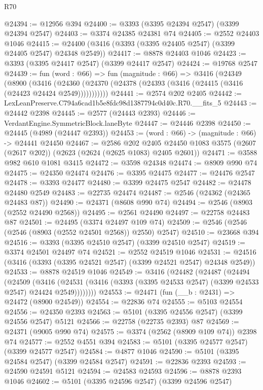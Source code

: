 \begin{lexlean}{R70}
\begin{coremodule}
@24394 := @12956 @394
@24400 := @3393 (@3395 @24394 @2547) (@3399 @24394 @2547)
@24403 := @3374 @24385 @24381 @74
@24405 := @2552 @24403 @1046
@24415 := @24400 (@3416 (@3393 (@3395 @24405 @2547) (@3399 @24405 @2547) @24348 @2549))
@24417 := @8878 @24403 @1046
@24423 := @3393 (@3395 @24417 @2547) (@3399 @24417 @2547)
@24424 := @19768 @2547
@24439 := fun (word : @66) =>
  fun (magnitude : @66) =>
  @3416
    (@24349
      (@8900
        (@3416 (@24360 (@24370 (@24378 (@24393 (@3416 (@24415 (@3416 (@24423 @24424 @2549)))))))))))
@24441 := @2574 @202 @2405
@24442 := LexLeanPreserve.C794a6cad1b5e8fdc98d1387794c0d40c.R70.__fits_5
@24443 := @24442 @2398
@24445 := @2577 (@24443 @2393)
@24446 := VerdantEngine.SymmetricBlock.laneByte
@24447 := @24446 @2398
@24450 := @24445 (@4989 (@24447 @2393))
@24453 := (word : @66) -> (magnitude : @66) -> @24441 @24450
@24467 := @2586
    @202
    @2405
    @24450
    @1083
    @3575
    (@2607 (@2617 @202))
    (@2623 (@2624 (@2625 @1083) @2405 @2601))
@24471 := @3588 @982 @610 @1081 @3415
@24472 := @3598 @24348
@24474 := @8909 @990 @74
@24475 := @24350 @24474
@24476 := @3395 @24475
@24477 := @24476 @2547
@24478 := @3393 @24477
@24480 := @3399 @24475 @2547
@24482 := @24478 @24480 @2549
@24483 := @22735 @24474
@24487 := @2546 (@24362 (@24365 @24483 @87))
@24490 := @24371 (@8608 @990 @74)
@24494 := @2546 (@8903 (@2552 @24490 @2568))
@24495 := @2561 @24490
@24497 := @22758 @24483 @87
@24501 := @24495 (@3374 @24497 @109 @74)
@24509 := @2546 (@2546 (@2546 (@8903 (@2552 @24501 @2568)) @2550) @2547)
@24510 := @23668 @394
@24516 := @3393 (@3395 @24510 @2547) (@3399 @24510 @2547)
@24519 := @3374 @24501 @24497 @74
@24521 := @2552 @24519 @1046
@24531 := @24516 (@3416 (@3393 (@3395 @24521 @2547) (@3399 @24521 @2547) @24348 @2549))
@24533 := @8878 @24519 @1046
@24549 := @3416
    (@24482
      (@24487
        (@24494
          (@24509
            (@3416
              (@24531 (@3416 (@3393 (@3395 @24533 @2547) (@3399 @24533 @2547) @24424 @2549))))))))
@24553 := @24471 (fun (__b : @2431) => @24472 (@8900 @24549))
@24554 := @22836 @74
@24555 := @5103 @24554
@24556 := @24350 @2393
@24563 := @5101 (@3395 @24556 @2547) (@3399 @24556 @2547) @5121
@24566 := @22758 (@22735 @2393) @87
@24569 := @24371 (@9005 @990 @74)
@24575 := @3374 (@2562 (@8909 @109 @74)) @2398 @74
@24577 := @2552 @4551 @394
@24583 := @5101 (@3395 @24577 @2547) (@3399 @24577 @2547)
@24584 := @4877 @1046
@24590 := @5101 (@3395 @24584 @2547) (@3399 @24584 @2547)
@24591 := @22836 @2393
@24593 := @24590 @24591 @5121
@24594 := @24583 @24593
@24596 := @8878 @2393 @1046
@24602 := @5101 (@3395 @24596 @2547) (@3399 @24596 @2547)

\end{coremodule}
\end{lexlean}

